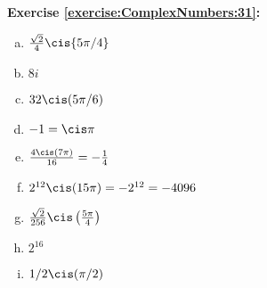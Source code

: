 \noindent\textbf{Exercise \ref{exercise:ComplexNumbers:31}:} %
\begin{multicols}{2}
\begin{enumerate}[(a)]
\item
$\frac{\sqrt{2}}{4} \cis{5\pi/4}$

\item
$8i$

\item
$32 \cis(5\pi/6)$

\item
$-1 = \cis \pi$

\item
$\frac{4\cis(7\pi)}{16}=-\frac{1}{4}$

\item
$2^{12}\cis(15\pi)=-2^{12}= -4096$
 
\item
$\frac{\sqrt{2}}{256}\cis\left(\frac{5\pi}{4}\right)$

\item
$2^{16}$

\item
$1/2 \cis( \pi/2)$
\end{enumerate}
\end{multicols}



